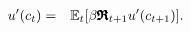 \begin{eqnarray}
        u^{\prime}({c}_{t}) & = & \mathbb{E}_{t}[\beta {\ensuremath{\pmb{\mathfrak{R}}}}_{t+1} u^{\prime}({c}_{t+1})]. \label{eq:EulercRiskyR}
\end{eqnarray}
